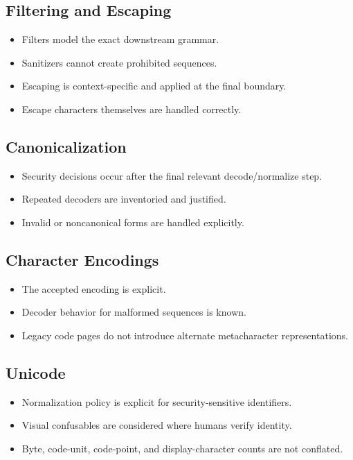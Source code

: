 \documentclass[11pt]{article}
\newcommand{\checkbox}{\(\square\)}
\begin{document}
\subsection*{Filtering and Escaping}
\begin{itemize}
  \item[\checkbox] Filters model the exact downstream grammar.
  \item[\checkbox] Sanitizers cannot create prohibited sequences.
  \item[\checkbox] Escaping is context-specific and applied at the final boundary.
  \item[\checkbox] Escape characters themselves are handled correctly.
\end{itemize}

\subsection*{Canonicalization}
\begin{itemize}
  \item[\checkbox] Security decisions occur after the final relevant decode/normalize step.
  \item[\checkbox] Repeated decoders are inventoried and justified.
  \item[\checkbox] Invalid or noncanonical forms are handled explicitly.
\end{itemize}

\subsection*{Character Encodings}
\begin{itemize}
  \item[\checkbox] The accepted encoding is explicit.
  \item[\checkbox] Decoder behavior for malformed sequences is known.
  \item[\checkbox] Legacy code pages do not introduce alternate metacharacter representations.
\end{itemize}

\subsection*{Unicode}
\begin{itemize}
  \item[\checkbox] Normalization policy is explicit for security-sensitive identifiers.
  \item[\checkbox] Visual confusables are considered where humans verify identity.
  \item[\checkbox] Byte, code-unit, code-point, and display-character counts are not conflated.
\end{itemize}
\end{document}
